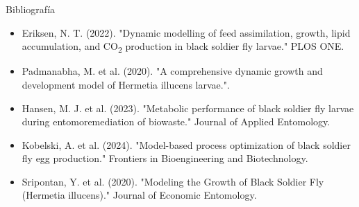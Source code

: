 \documentclass{beamer}
\begin{document}
\begin{frame}{Bibliografía}
    \small
    \begin{itemize}
        \item Eriksen, N. T. (2022). "Dynamic modelling of feed assimilation, growth, lipid accumulation, and CO\textsubscript{2} production in black soldier fly larvae." PLOS ONE.
        \item Padmanabha, M. et al. (2020). "A comprehensive dynamic growth and development model of Hermetia illucens larvae.".
        \item Hansen, M. J. et al. (2023). "Metabolic performance of black soldier fly larvae during entomoremediation of biowaste." Journal of Applied Entomology.
        \item Kobelski, A. et al. (2024). "Model-based process optimization of black soldier fly egg production." Frontiers in Bioengineering and Biotechnology.
        \item Sripontan, Y. et al. (2020). "Modeling the Growth of Black Soldier Fly (Hermetia illucens)." Journal of Economic Entomology.
    \end{itemize}
\end{frame}
\end{document}

